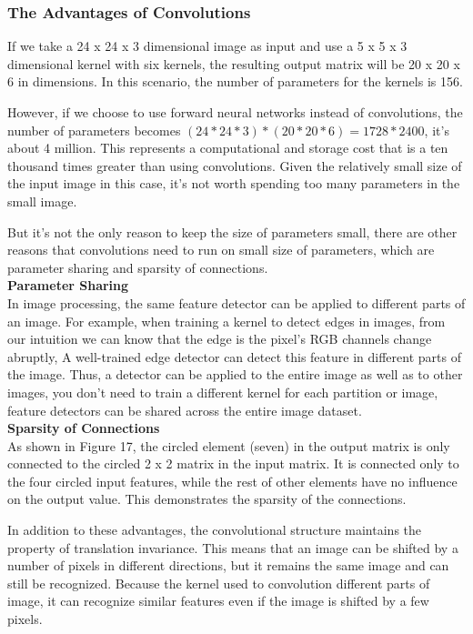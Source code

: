 \documentclass{article}
\begin{document}
\newpage
\subsubsection{The Advantages of Convolutions}
If we take a 24 x 24 x 3 dimensional image as input and use a 5 x 5 x 3 dimensional kernel with six kernels, the resulting output matrix will be 20 x 20 x 6 in dimensions. In this scenario, the number of parameters for the kernels is 156.

However, if we choose to use forward neural networks instead of convolutions, the number of parameters becomes $(24 * 24 * 3) * (20 * 20 * 6) = 1728 * 2400 $, it's about 4 million. This represents a computational and storage cost that is a ten thousand times greater than using convolutions. Given the relatively small size of the input image in this case, it's not worth spending too many parameters in the small image.

But it's not the only reason to keep the size of parameters small, there are other reasons that convolutions need to run on small size of parameters, which are parameter sharing and sparsity of connections.\\


\noindent
\textbf{Parameter Sharing}\\
\noindent
In image processing, the same feature detector can be applied to different parts of an image. For example, when training a kernel to detect edges in images, from our intuition we can know that the edge is the pixel's RGB channels change abruptly, A well-trained edge detector can detect this feature in different parts of the image. Thus, a detector can be applied to the entire image as well as to other images, you don't need to train a different kernel for each partition or image, feature detectors can be shared across the entire image dataset.\\

\noindent
\textbf{Sparsity of Connections}\\
\noindent
As shown in Figure 17, the circled element (seven) in the output matrix is only connected to the circled 2 x 2 matrix in the input matrix. It is connected only to the four circled input features, while the rest of other elements have no influence on the output value. This demonstrates the sparsity of the connections.

In addition to these advantages, the convolutional structure maintains the property of translation invariance. This means that an image can be shifted by a number of pixels in different directions, but it remains the same image and can still be recognized. Because the kernel used to convolution different parts of image, it can recognize similar features even if the image is shifted by a few pixels.
\end{document}
